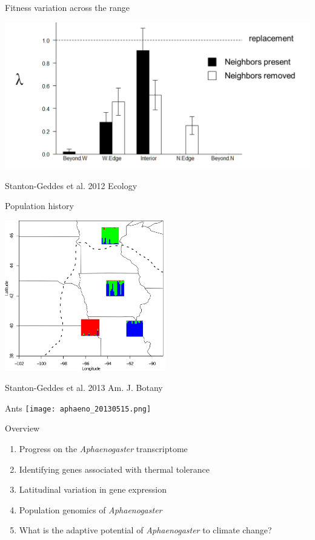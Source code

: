 \documentclass{beamer}
\begin{document}
\begin{frame}{Fitness variation across the range}
	\begin{center}
		\includegraphics[width=\textwidth, height=\textheight, keepaspectratio]{chamae2010_popgrowth.png}
	\end{center}
	\tiny{Stanton-Geddes et al. 2012 Ecology}
\end{frame}

\begin{frame}{Population history}
	\begin{center}
		\includegraphics[width=7cm]{chamae_popgen.png}
	\end{center}	
	\tiny{Stanton-Geddes et al. 2013 Am. J. Botany}
\end{frame}

\begin{frame}{Ants}
		\texttt{[image: aphaeno\_20130515.png]}
\end{frame}

\begin{frame}{Overview}
  \begin{enumerate}
  	\item<1-| alert@1>Progress on the \textit{Aphaenogaster} transcriptome
  	\item Identifying genes associated with thermal tolerance
	\item Latitudinal variation in gene expression
  	\item Population genomics of \textit{Aphaenogaster}
  	\item What is the adaptive potential of \textit{Aphaenogaster} to climate change?
  \end{enumerate}
\end{frame}
\end{document}
